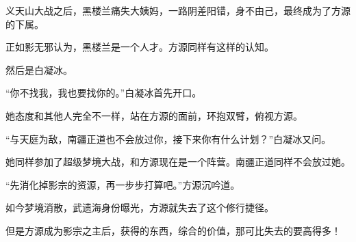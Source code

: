 \begin{this_body}
义天山大战之后，黑楼兰痛失大姨妈，一路阴差阳错，身不由己，最终成为了方源的下属。

正如影无邪认为，黑楼兰是一个人才。方源同样有这样的认知。

然后是白凝冰。

“你不找我，我也要找你的。”白凝冰首先开口。

她态度和其他人完全不一样，站在方源的面前，环抱双臂，俯视方源。

“与天庭为敌，南疆正道也不会放过你，接下来你有什么计划？”白凝冰又问。

她同样参加了超级梦境大战，和方源现在是一个阵营。南疆正道同样不会放过她。

“先消化掉影宗的资源，再一步步打算吧。”方源沉吟道。

如今梦境消散，武遗海身份曝光，方源就失去了这个修行捷径。

但是方源成为影宗之主后，获得的东西，综合的价值，那可比失去的要高得多！

\end{this_body}

